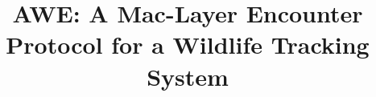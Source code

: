 \documentclass[conference,10pt]{IEEEtran}
\newcommand{\pName}{AWE}
\begin{document}
\title{{\pName}: A Mac-Layer Encounter Protocol for a Wildlife Tracking System}



\maketitle





% 















\end{document}
